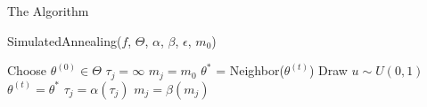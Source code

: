 \documentclass[{pdf, t}]{beamer}
\begin{document}
\begin{frame}{The Algorithm}
\begin{algorithm}[H]
\caption{SimulatedAnnealing($f$, $\Theta$, $\alpha$, $\beta$, $\epsilon$, $m_0$)}
\begin{algorithmic}[1]
\STATE Choose $\theta^{(0)} \in \Theta$
\STATE $\tau_j = \infty$
\STATE $m_j = m_0$
    \STATE $\theta^*$ = Neighbor($\theta^{(t)}$)
    \STATE Draw $u \sim U(0, 1)$
      \STATE $\theta^{(t)} = \theta^*$
    \ENDIF
  \ENDFOR
  \STATE $\tau_j = \alpha (\tau_{j})$
  \STATE $m_j = \beta(m_{j})$
\ENDWHILE
\end{algorithmic}
\end{algorithm}
\end{frame}
\end{document}
